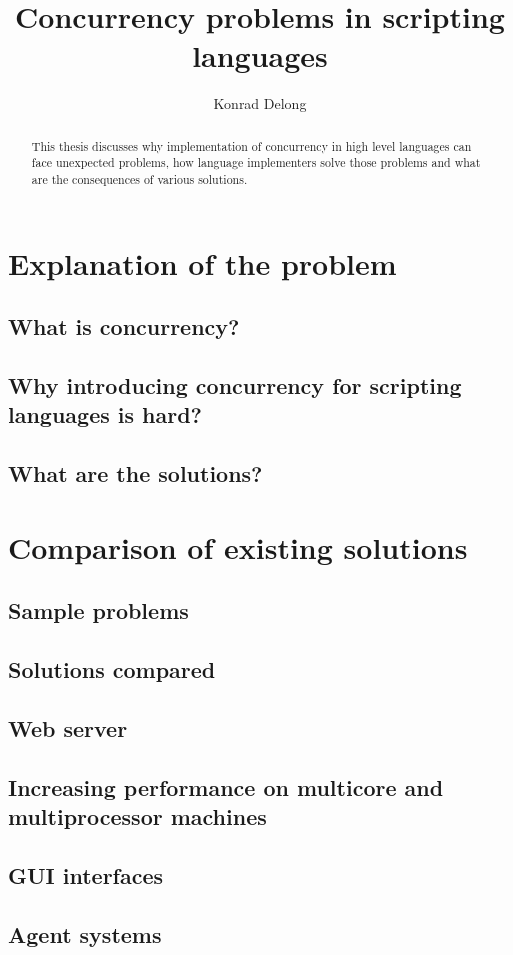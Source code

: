 \documentclass{report}
\begin{document}
\title{Concurrency problems in scripting languages}
\author{Konrad Delong}
\date{}

\maketitle

\begin{abstract}
This thesis discusses why implementation of concurrency in high level languages
can face unexpected problems, how language implementers solve those problems and
what are the consequences of various solutions.
\end{abstract}

\tableofcontents

\chapter{Explanation of the problem}
\section{What is concurrency?}
\section{Why introducing concurrency for scripting languages is hard?}
\section{What are the solutions?}

\chapter{Comparison of existing solutions}

\section{Sample problems}
\section{Solutions compared}

\section{Web server}
\section{Increasing performance on multicore and multiprocessor machines}
\section{GUI interfaces}
\section{Agent systems}
\end{document}
